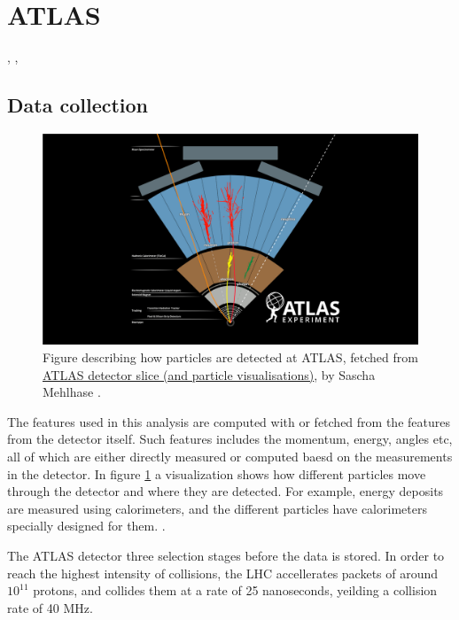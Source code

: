 \section{ATLAS}

, \cite{collaboration_2020}, \cite{Owen:2302730} 






\subsection*{Data collection}

\begin{figure}[h!]
    \includegraphics[width=\linewidth]{Figures/atlas/ATLAS Detector Schematic black particles.png}
    \caption{Figure describing how particles are detected at ATLAS, fetched from \href{https://cds.cern.ch/record/2770815}{	ATLAS detector slice (and particle visualisations)}, by Sascha Mehlhase \cite{Mehlhase:2770815} . }
    \label{fig:atlas_particle_detect}
\end{figure}

The features used in this analysis are computed with or fetched from the features from the detector itself. Such features includes the momentum, energy, angles etc, 
all of which are either directly measured or computed baesd on the measurements in the detector. In figure \ref{fig:atlas_particle_detect} a visualization shows how
different particles move through the detector and where they are detected. For example, energy deposits are measured using calorimeters, and the different particles 
have calorimeters specially designed for them. . \par

The ATLAS detector three selection stages before the data is stored. In order to reach the highest intensity of collisions, the LHC accellerates
packets of around $10^{11}$ protons, and collides them at a rate of 25 nanoseconds, yeilding a collision rate of 40 MHz\cite{Wang:2707056}. \cite{Bernius:2707054}

